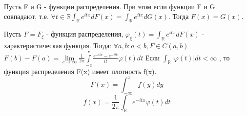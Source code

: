 \documentclass{article}
\begin{document}
Пусть F и G - функции распределения. При этом если функции F и G совпадают, т.е. $\forall  t \in \mathbb {R}  \int_{\mathbb {R}} e^{itx}d{F(x)} = \int_{\mathbb {R}} e^{itx}d{G(x)}$. Тогда $F(x) = G(x)$.

Пусть $F = F_\xi$ - функция распределения, $\varphi_{\xi}(t) =\int_{\mathbb {R}} e^{itx}d{F(x)} $ - характеристическая функция. Тогда: $\forall {a,b}: a<b, F \in C(a,b)$
$F(b) - F(a) = \lim\limits_{c\to\infty} \frac{1}{2\pi} \int\limits_{-c}^c \frac{e^{-ita}-e^{-itb}}{it} \varphi(t)dt$
Если $\int_{\mathbb {R}} |\varphi(t)|dt <  \infty$ , то функция распределения F(x) имеет плотность  f(x).
$$F(x) = \int_{-\infty}^x f(y)dy$$
$$f(x) = \frac{1}{2\pi}\int_{\mathbb {R}}e^{-itx}\varphi(t)dt$$
\end{document}
